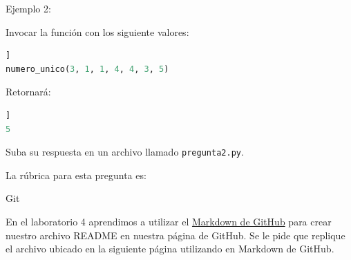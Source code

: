 \documentclass[12pt]{exam}
\begin{document}
\begin{questions}
Ejemplo 2:

Invocar la función con los siguiente valores:

\begin{lstlisting}[frame = single, language=python, caption=Ejemplo 2]]
numero_unico(3, 1, 1, 4, 4, 3, 5)
\end{lstlisting}
Retornará:
\begin{lstlisting}[frame = single, language=python, caption=Output 2]]
5
\end{lstlisting}

Suba su respuesta en un archivo llamado \lstinline{pregunta2.py}.



\newpage

La r\'ubrica para esta pregunta es:

\begin{table}[h]
\end{table}


\newpage

\question[5] Git

En el laboratorio 4 aprendimos a utilizar el \href{https://docs.github.com/en/github/writing-on-github/getting-started-with-writing-and-formatting-on-github/basic-writing-and-formatting-syntax}{Markdown de GitHub} para crear nuestro archivo README en nuestra página de GitHub. Se le pide que replique el archivo ubicado en la siguiente página utilizando en Markdown de GitHub.


\end{questions}
\end{document}
